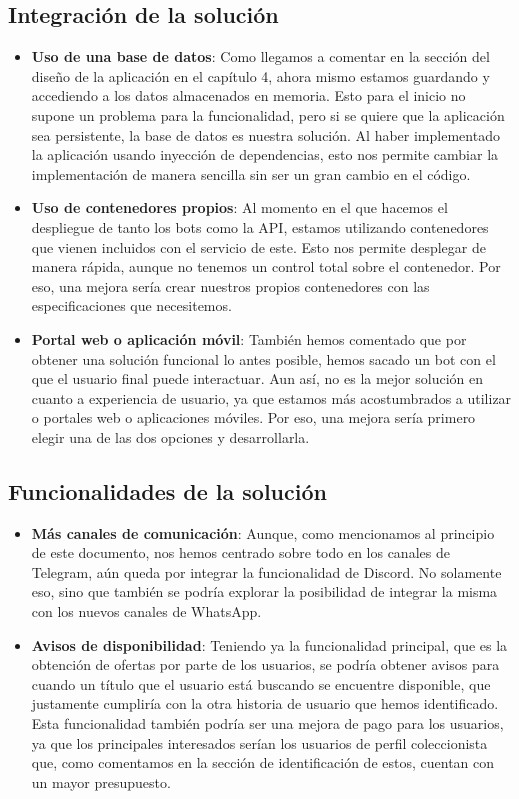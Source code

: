 \subsection{Integración de la solución}
\begin{itemize}
    \item \textbf{Uso de una base de datos}: Como llegamos a comentar en la sección 
    del diseño de la aplicación en el capítulo 4, ahora mismo estamos guardando y 
    accediendo a los datos almacenados en memoria. Esto para el inicio no supone un 
    problema para la funcionalidad, pero si se quiere que la aplicación sea 
    persistente, la base de datos es nuestra solución. Al haber implementado la 
    aplicación usando inyección de dependencias, esto nos permite cambiar la 
    implementación de manera sencilla sin ser un gran cambio en el código.
    \item \textbf{Uso de contenedores propios}: Al momento en el que hacemos el 
    despliegue de tanto los bots como la API, estamos utilizando contenedores que 
    vienen incluidos con el servicio de este. Esto nos permite desplegar de manera 
    rápida, aunque no tenemos un control total sobre el contenedor. Por eso, una 
    mejora sería crear nuestros propios contenedores con las especificaciones que 
    necesitemos.
    \item \textbf{Portal web o aplicación móvil}: También hemos comentado que por 
    obtener una solución funcional lo antes posible, hemos sacado un bot con el que 
    el usuario final puede interactuar. Aun así, no es la mejor solución en cuanto 
    a experiencia de usuario, ya que estamos más acostumbrados a utilizar o 
    portales web o aplicaciones móviles. Por eso, una mejora sería primero elegir 
    una de las dos opciones y desarrollarla.
\end{itemize}

\subsection{Funcionalidades de la solución}
\begin{itemize}
    \item \textbf{Más canales de comunicación}: Aunque, como mencionamos al 
    principio de este documento, nos hemos centrado sobre todo en los canales de 
    Telegram, aún queda por integrar la funcionalidad de Discord. No solamente eso, 
    sino que también se podría explorar la posibilidad de integrar la misma con 
    los nuevos canales de WhatsApp.
    \item \textbf{Avisos de disponibilidad}: Teniendo ya la funcionalidad 
    principal, que es la obtención de ofertas por parte de los usuarios, se podría 
    obtener avisos para cuando un título que el usuario está buscando se encuentre 
    disponible, que justamente cumpliría con la otra historia de usuario que hemos 
    identificado. Esta funcionalidad también podría ser una mejora de pago para los 
    usuarios, ya que los principales interesados serían los usuarios de perfil 
    coleccionista que, como comentamos en la sección de identificación de estos, 
    cuentan con un mayor presupuesto.
\end{itemize}